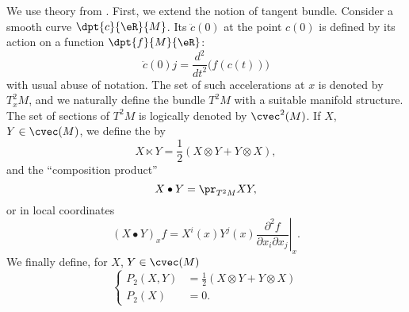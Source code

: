 We use theory from \cite{Loos}. First, we extend the notion of tangent bundle. Consider a smooth curve $\dpt{c}{\eR}{M}$. Its  $\ddot c(0)$ at the point $c(0)$ is defined by its action on a function $\dpt{f}{M}{\eR}$:
\begin{equation}
  \ddot c(0)j=\frac{d^2}{dt^2}\big( f(c(t))\big)
\end{equation}
with usual abuse of notation. The set of such accelerations at $x$ is denoted by $T^2_xM$, and we naturally define the bundle $T^2M$ with a suitable manifold structure. The set of sections of $T^2M$ is logically denoted by $\cvec^2(M)$. If $X$, $Y\in\cvec(M)$, we define the  by
\begin{equation}
X\ltimes Y=\frac{1}{2}(X\otimes Y+Y\otimes X),
\end{equation}
and the ``composition product''
\begin{equation}
  X\bullet Y=\pr_{T^2M} XY,
\end{equation}
or in local coordinates
\[ 
  (X\bullet Y)_x f= X^i(x)Y^j(x)\left.\frac{\partial^2f}{\partial x_i\partial x_j}\right|_x.
\]
We finally define, for $X$, $Y\in\cvec(M)$
\begin{equation}
\left\{
\begin{aligned}
  P_2(X,Y)&=\frac{1}{2}(X\otimes Y+Y\otimes X)\\
  P_2(X)&=0.
\end{aligned}
\right. 
\end{equation}

